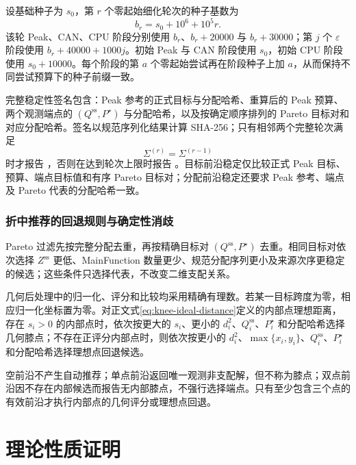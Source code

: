 \documentclass[UTF8,a4paper,twoside,zihao=-4]{ctexart}
\numberwithin{equation}{section}
\numberwithin{figure}{section}
\numberwithin{table}{section}
\theoremstyle{definition}
\numberwithin{algocf}{section}
\begin{document}
设基础种子为 $s_0$，第 $r$ 个零起始细化轮次的种子基数为
\begin{equation}
 b_r=s_0+10^6+10^5r.
\label{eq:joint-refinement-seed-base}
\end{equation}
该轮 Peak、CAN、CPU 阶段分别使用 $b_r$、$b_r+20000$ 与 $b_r+30000$；第 $j$ 个 $\varepsilon$ 阶段使用 $b_r+40000+1000j$。初始 Peak 与 CAN 阶段使用 $s_0$，初始 CPU 阶段使用 $s_0+10000$。每个阶段的第 $a$ 个零起始尝试再在阶段种子上加 $a$，从而保持不同尝试预算下的种子前缀一致。

完整稳定性签名包含：Peak 参考的正式目标与分配哈希、重算后的 Peak 预算、两个观测端点的 $(Q^{\mathrm{ss}},P^\star)$ 与分配哈希，以及按确定顺序排列的 Pareto 目标对和对应分配哈希。签名以规范序列化结果计算 SHA-256；只有相邻两个完整轮次满足
\begin{equation}
 \Sigma^{(r)}=\Sigma^{(r-1)}
\label{eq:refinement-signature-equality}
\end{equation}
时才报告 ，否则在达到轮次上限时报告 。目标前沿稳定仅比较正式 Peak 目标、预算、端点目标值和有序 Pareto 目标对；分配前沿稳定还要求 Peak 参考、端点及 Pareto 代表的分配哈希一致。

\subsubsection{折中推荐的回退规则与确定性消歧}
\label{subsubsec:appendix-joint-recommendation-details}

Pareto 过滤先按完整分配去重，再按精确目标对 $(Q^{\mathrm{ss}},P^\star)$ 去重。相同目标对依次选择 $Z^{\mathrm{ss}}$ 更低、MainFunction 数量更少、规范分配序列更小及来源次序更稳定的候选；这些条件只选择代表，不改变二维支配关系。

几何后处理中的归一化、评分和比较均采用精确有理数。若某一目标跨度为零，相应归一化坐标置为零。对正文式\eqref{eq:knee-ideal-distance}定义的内部点理想距离，存在 $s_i>0$ 的内部点时，依次按更大的 $s_i$、更小的 $d_i^2$、$Q_i^{\mathrm{ss}}$、$P_i^\star$ 和分配哈希选择几何膝点；不存在正评分内部点时，则依次按更小的 $d_i^2$、$\max\{x_i,y_i\}$、$Q_i^{\mathrm{ss}}$、$P_i^\star$ 和分配哈希选择理想点回退候选。

空前沿不产生自动推荐；单点前沿返回唯一观测非支配解，但不称为膝点；双点前沿因不存在内部候选而报告无内部膝点，不强行选择端点。只有至少包含三个点的有效前沿才执行内部点的几何评分或理想点回退。

\clearpage
\section{理论性质证明}
\label{sec:appendix-proofs}
\end{document}
